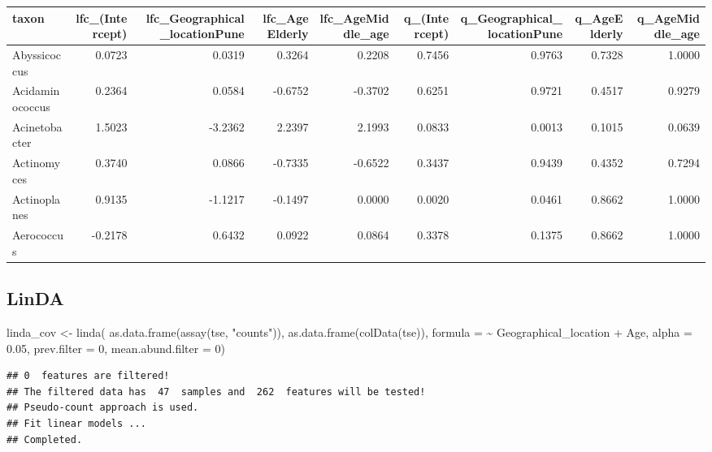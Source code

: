 \documentclass[
]{book}
\newenvironment{Shaded}{\begin{snugshade}}{\end{snugshade}}
\newcommand{\AttributeTok}[1]{\textcolor[rgb]{0.77,0.63,0.00}{#1}}
\newcommand{\DecValTok}[1]{\textcolor[rgb]{0.00,0.00,0.81}{#1}}
\newcommand{\FloatTok}[1]{\textcolor[rgb]{0.00,0.00,0.81}{#1}}
\newcommand{\FunctionTok}[1]{\textcolor[rgb]{0.00,0.00,0.00}{#1}}
\newcommand{\NormalTok}[1]{#1}
\newcommand{\OtherTok}[1]{\textcolor[rgb]{0.56,0.35,0.01}{#1}}
\newcommand{\StringTok}[1]{\textcolor[rgb]{0.31,0.60,0.02}{#1}}
\begin{document}
\begin{tabular}{l|r|r|r|r|r|r|r|r}
\hline
taxon & lfc\_(Intercept) & lfc\_Geographical\_locationPune & lfc\_AgeElderly & lfc\_AgeMiddle\_age & q\_(Intercept) & q\_Geographical\_locationPune & q\_AgeElderly & q\_AgeMiddle\_age\\
\hline
Abyssicoccus & 0.0723 & 0.0319 & 0.3264 & 0.2208 & 0.7456 & 0.9763 & 0.7328 & 1.0000\\
\hline
Acidaminococcus & 0.2364 & 0.0584 & -0.6752 & -0.3702 & 0.6251 & 0.9721 & 0.4517 & 0.9279\\
\hline
Acinetobacter & 1.5023 & -3.2362 & 2.2397 & 2.1993 & 0.0833 & 0.0013 & 0.1015 & 0.0639\\
\hline
Actinomyces & 0.3740 & 0.0866 & -0.7335 & -0.6522 & 0.3437 & 0.9439 & 0.4352 & 0.7294\\
\hline
Actinoplanes & 0.9135 & -1.1217 & -0.1497 & 0.0000 & 0.0020 & 0.0461 & 0.8662 & 1.0000\\
\hline
Aerococcus & -0.2178 & 0.6432 & 0.0922 & 0.0864 & 0.3378 & 0.1375 & 0.8662 & 1.0000\\
\hline
\end{tabular}

\hypertarget{linda-1}{%
\subsection{LinDA}\label{linda-1}}

\begin{Shaded}
\begin{Highlighting}[]
\NormalTok{linda\_cov }\OtherTok{\textless{}{-}} \FunctionTok{linda}\NormalTok{(}
  \FunctionTok{as.data.frame}\NormalTok{(}\FunctionTok{assay}\NormalTok{(tse, }\StringTok{"counts"}\NormalTok{)), }
  \FunctionTok{as.data.frame}\NormalTok{(}\FunctionTok{colData}\NormalTok{(tse)), }
  \AttributeTok{formula =} \StringTok{\textquotesingle{}\textasciitilde{} Geographical\_location + Age\textquotesingle{}}\NormalTok{, }
  \AttributeTok{alpha =} \FloatTok{0.05}\NormalTok{, }
  \AttributeTok{prev.filter =} \DecValTok{0}\NormalTok{, }
  \AttributeTok{mean.abund.filter =} \DecValTok{0}\NormalTok{)}
\end{Highlighting}
\end{Shaded}

\begin{verbatim}
## 0  features are filtered!
## The filtered data has  47  samples and  262  features will be tested!
## Pseudo-count approach is used.
## Fit linear models ...
## Completed.
\end{verbatim}
\end{document}
